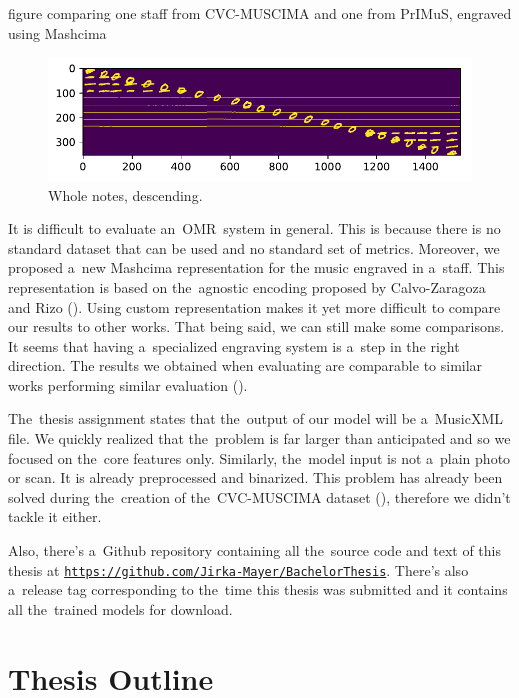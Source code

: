 \begin{code}
figure comparing one staff from CVC-MUSCIMA
and one from PrIMuS,
engraved using Mashcima
\end{code}

\begin{figure}[h]\centering
\includegraphics[width=140mm]{../img/test_1}
\caption{Whole notes, descending.}
\label{fig:WholeNotesDescending}
\end{figure}

It is difficult to evaluate an~OMR~system in general. This is because there is no standard dataset that can be used and no standard set of metrics. Moreover, we proposed a~new Mashcima representation for the music engraved in a~staff. This representation is based on the~agnostic encoding proposed by Calvo-Zaragoza and Rizo (\cite{Primus}). Using custom representation makes it yet more difficult to compare our results to other works. That being said, we can still make some comparisons. It seems that having a~specialized engraving system is a~step in the right direction. The results we obtained when evaluating are comparable to similar works performing similar evaluation (\cite{HmrBaseline}).

The~thesis assignment states that the~output of our model will be a~MusicXML file. We quickly realized that the~problem is far larger than anticipated and so we focused on the~core features only. Similarly, the~model input is not a~plain photo or scan. It is already preprocessed and binarized. This problem has already been solved during the~creation of the~CVC-MUSCIMA dataset (\cite{CvcMuscima}), therefore we didn't tackle it either.

Also, there's a~Github repository containing all the~source code and text of this thesis at \href{https://github.com/Jirka-Mayer/BachelorThesis}{\texttt{https://github.com/Jirka-Mayer/BachelorThesis}}. There's also a~release tag corresponding to the~time this thesis was submitted and it contains all the~trained models for download.

\section{Thesis Outline}

